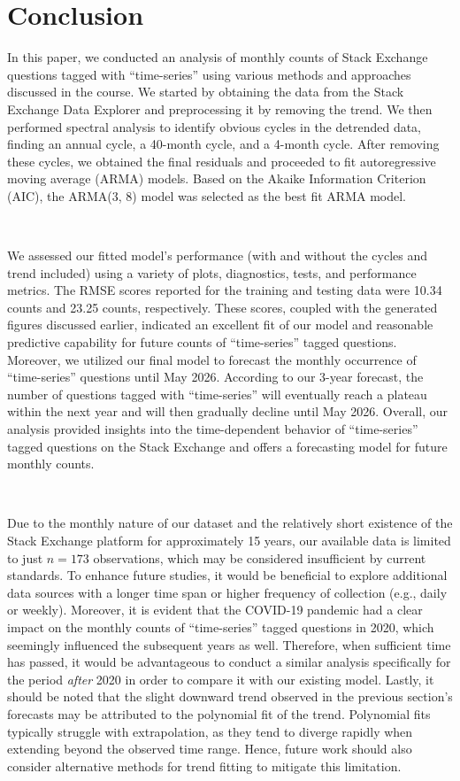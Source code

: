 \documentclass[10pt]{article}
\begin{document}
\section*{Conclusion}

In this paper, we conducted an analysis of monthly counts of Stack Exchange questions tagged with ``time-series'' using various methods and approaches discussed in the course. We started by obtaining the data from the Stack Exchange Data Explorer and preprocessing it by removing the trend. We then performed spectral analysis to identify obvious cycles in the detrended data, finding an annual cycle, a 40-month cycle, and a 4-month cycle. After removing these cycles, we obtained the final residuals and proceeded to fit autoregressive moving average (ARMA) models. Based on the Akaike Information Criterion (AIC), the ARMA(3, 8) model was selected as the best fit ARMA model. 

\


We assessed our fitted model's performance (with and without the cycles and trend included) using a variety of plots, diagnostics, tests, and performance metrics. The RMSE scores reported for the training and testing data were 10.34 counts and 23.25 counts, respectively. These scores, coupled with the generated figures discussed earlier, indicated an excellent fit of our model and reasonable predictive capability for future counts of ``time-series'' tagged questions. Moreover, we utilized our final model to forecast the monthly occurrence of ``time-series'' questions until May 2026. According to our 3-year forecast, the number of questions tagged with ``time-series'' will eventually reach a plateau within the next year and will then gradually decline until May 2026. Overall, our analysis provided insights into the time-dependent behavior of ``time-series'' tagged questions on the Stack Exchange and offers a forecasting model for future monthly counts.

\

Due to the monthly nature of our dataset and the relatively short existence of the Stack Exchange platform for approximately 15 years, our available data is limited to just $n=173$ observations, which may be considered insufficient by current standards. To enhance future studies, it would be beneficial to explore additional data sources with a longer time span or higher frequency of collection (e.g., daily or weekly). Moreover, it is evident that the COVID-19 pandemic had a clear impact on the monthly counts of ``time-series'' tagged questions in 2020, which seemingly influenced the subsequent years as well. Therefore, when sufficient time has passed, it would be advantageous to conduct a similar analysis specifically for the period \textit{after} 2020 in order to compare it with our existing model. Lastly, it should be noted that the slight downward trend observed in the previous section's forecasts may be attributed to the polynomial fit of the trend. Polynomial fits typically struggle with extrapolation, as they tend to diverge rapidly when extending beyond the observed time range. Hence, future work should also consider alternative methods for trend fitting to mitigate this limitation.
\end{document}
